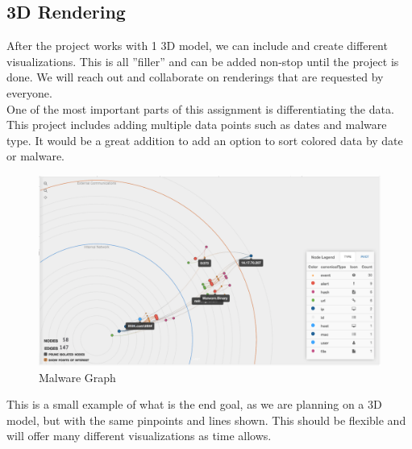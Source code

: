 \documentclass[journal,10pt,onecolumn,compsoc]{IEEEtran} \usepackage[margin=1.0in]{geometry} \usepackage{pdfpages}
\begin{document}
    \subsection{3D Rendering}
    After the project works with 1 3D model, we can include and create different visualizations. This is all ”filler” and can be added non-stop until the project is done. We will reach out and collaborate on renderings that are requested by everyone.\\
    \newline
    One of the most important parts of this assignment is differentiating the data. This project includes adding multiple data points such as dates and malware type. It would be a great addition to add an option to sort colored data by date or malware.\\
     
     \begin{figure}[H]
         \centering
         \includegraphics[width=\linewidth]{./Graph1.png}
         \caption{ Malware Graph}
     \end{figure}
    \noindent This is a small example\cite{MalwareGraph} of what is the end goal, as we are planning on a 3D model, but with the same pinpoints and lines shown. This should be flexible and will offer many different visualizations as time allows.\\
\end{document}

